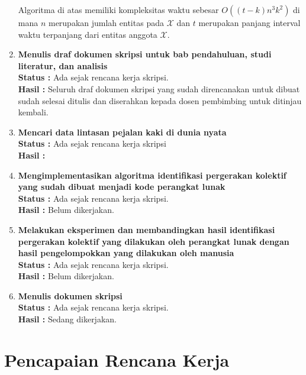 \documentclass[a4paper,twoside]{article}
\begin{document}
\begin{enumerate}
        Algoritma di atas memiliki kompleksitas waktu sebesar $O((t - k)n^3k^2)$ di mana $n$ merupakan jumlah entitas pada $\mathcal{X}$ dan $t$ merupakan panjang interval waktu terpanjang dari entitas anggota $\mathcal{X}$. \\

		\item \textbf{Menulis draf dokumen skripsi untuk bab pendahuluan, studi literatur, dan analisis}\\
		{\bf Status :} Ada sejak rencana kerja skripsi.\\
		{\bf Hasil :} Seluruh draf dokumen skripsi yang sudah direncanakan untuk dibuat sudah selesai ditulis dan diserahkan kepada dosen pembimbing untuk ditinjau kembali.

		\item \textbf{Mencari data lintasan pejalan kaki di dunia nyata}\\
		{\bf Status :} Ada sejak rencana kerja skripsi \\
		{\bf Hasil :} 

		\item \textbf{Mengimplementasikan algoritma identifikasi pergerakan kolektif yang sudah dibuat menjadi kode perangkat lunak} \\
		{\bf Status :} Ada sejak rencana kerja skripsi.\\
		{\bf Hasil :} Belum dikerjakan. \\

		\item \textbf{Melakukan eksperimen dan membandingkan hasil identifikasi pergerakan kolektif yang dilakukan oleh perangkat lunak dengan hasil pengelompokkan yang dilakukan oleh manusia}\\
		{\bf Status :} Ada sejak rencana kerja skripsi.\\
		{\bf Hasil :} Belum dikerjakan. \\

		\item \textbf{Menulis dokumen skripsi}\\
		{\bf Status :} Ada sejak rencana kerja skripsi.\\
		{\bf Hasil :} Sedang dikerjakan.
	\end{enumerate}
	
\fi

\section{Pencapaian Rencana Kerja}
\end{document}

